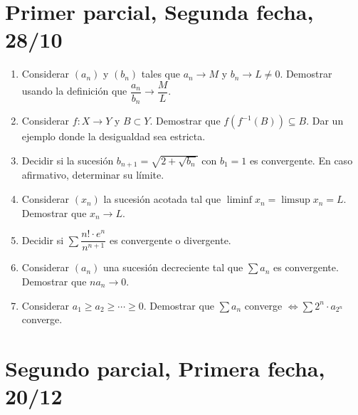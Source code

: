 \clearpage

\section{Primer parcial, Segunda fecha, 28/10}

\begin{enumerate}
  \item Considerar \((a_n)\) y \((b_n)\) tales que \(a_n \to M\) y \(b_n \to L \neq 0\). Demostrar usando la definición que \(\dfrac{a_n}{b_n} \to \dfrac{M}{L} \).
  \item Considerar \(f: X \to Y\) y \(B \subset Y\). Demostrar que \(f(f^{-1}(B)) \subseteq B\). Dar un ejemplo donde la desigualdad sea estricta.
  \item Decidir si la sucesión \(b_{n+1} = \sqrt{2 + \sqrt{b_n}} \) con \(b_1 = 1\) es convergente. En caso afirmativo, determinar su límite.
  \item Considerar \((x_n)\) la sucesión acotada tal que \(\liminf x_n = \limsup x_n = L\). Demostrar que \(x_n \to L\).
  \item Decidir si \(\sum \dfrac{n! \cdot e^n}{n^{n+1}} \) es convergente o divergente.
  \item Considerar \((a_n)\) una sucesión decreciente tal que \(\sum a_n\) es convergente. Demostrar que \(n a_n \to 0\).
  \item Considerar \(a_1 \geq a_2 \geq \cdots \geq 0\). Demostrar que \(\sum a_n\) converge \(\iff \sum 2^n \cdot a_{2^n} \) converge.
\end{enumerate}

\clearpage

\section{Segundo parcial, Primera fecha, 20/12}

